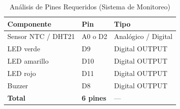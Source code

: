 
\begin{table}[ht]
\caption{Análisis de Pines Requeridos (Sistema de Monitoreo)}
\label{tab:Tabla_2_R2}
\centering
\renewcommand{\arraystretch}{1.3}
\begin{tabularx}{\columnwidth}{X p{2.0cm} p{2.0cm}}
\toprule
\textbf{Componente} & \textbf{Pin} & \textbf{Tipo} \\
\midrule
Sensor NTC / DHT21 & A0 o D2 & Analógico / Digital \\
LED verde & D9 & Digital OUTPUT \\
LED amarillo & D10 & Digital OUTPUT \\
LED rojo & D11 & Digital OUTPUT \\
Buzzer & D8 & Digital OUTPUT \\

\midrule
\textbf{Total} & \textbf{6 pines} & --- \\
\bottomrule
\end{tabularx}
\end{table}